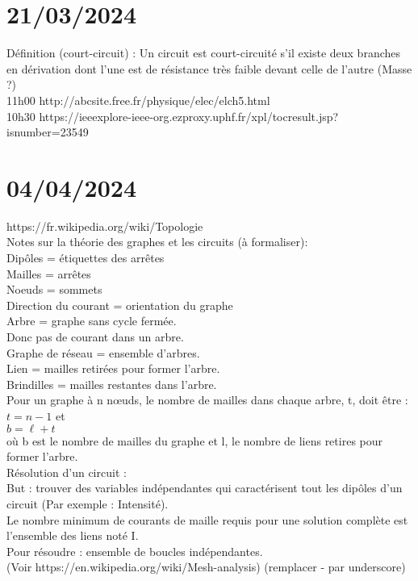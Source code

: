 \documentclass[11pt]{article}
\begin{document}
    \section{21/03/2024}
    Définition (court-circuit) : Un circuit est court-circuité s'il existe
    deux branches en dérivation dont l'une est de résistance très faible devant celle de l'autre (Masse ?)
    \\
    11h00 http://abcsite.free.fr/physique/elec/elch5.html
    \\
    10h30 https://ieeexplore-ieee-org.ezproxy.uphf.fr/xpl/tocresult.jsp?isnumber=23549

    \section{04/04/2024}
    https://fr.wikipedia.org/wiki/Topologie \\
   Notes sur la théorie des graphes et les circuits (à formaliser): \\
   Dipôles = étiquettes des arrêtes \\
   Mailles = arrêtes \\
   Noeuds = sommets \\
   Direction du courant = orientation du graphe \\
   
   Arbre = graphe sans cycle fermée. \\
   Donc pas de courant dans un arbre. \\
   Graphe de réseau = ensemble d'arbres. \\
   Lien = mailles retirées pour former l'arbre. \\
   Brindilles = mailles restantes dans l'arbre. \\
   Pour un graphe à n nœuds, le nombre de mailles dans chaque arbre, t, doit être : 
   $\displaystyle t=n-1 $ et \\ 
   $\displaystyle b=\ell +t $ \\
   où b est le nombre de mailles du graphe et l, le nombre de liens 
   retires pour former l'arbre. \\
   Résolution d'un circuit : \\
   But : trouver des variables indépendantes qui caractérisent tout les dipôles d'un circuit (Par exemple : Intensité). \\
   Le nombre minimum de courants de maille requis pour une solution complète est l'ensemble des liens noté I. \\
   Pour résoudre : ensemble de boucles indépendantes. \\ (Voir https://en.wikipedia.org/wiki/Mesh-analysis) (remplacer - par underscore) \\


   



    
\end{document}
